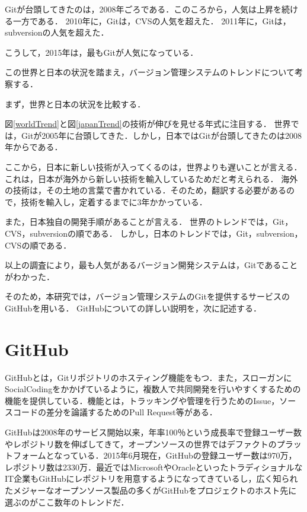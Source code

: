 Gitが台頭してきたのは，2008年ごろである．このころから，人気は上昇を続ける一方である．
2010年に，Gitは，CVSの人気を超えた．
2011年に，Gitは，subversionの人気を超えた．

こうして，2015年は，最もGitが人気になっている．

この世界と日本の状況を踏まえ，バージョン管理システムのトレンドについて考察する．

まず，世界と日本の状況を比較する．

図\ref{worldTrend}と図\ref{japanTrend}の技術が伸びを見せる年式に注目する．
世界では，Gitが2005年に台頭してきた．しかし，日本ではGitが台頭してきたのは2008年からである．

ここから，日本に新しい技術が入ってくるのは，世界よりも遅いことが言える．
これは，日本が海外から新しい技術を輸入しているためだと考えられる．
海外の技術は，その土地の言葉で書かれている．そのため，翻訳する必要があるので，技術を輸入し，定着するまでに3年かかっている．


また，日本独自の開発手順があることが言える．
世界のトレンドでは，Git，CVS，subversionの順である．
しかし，日本のトレンドでは，Git，subversion，CVSの順である．

以上の調査により，最も人気があるバージョン開発システムは，Gitであることがわかった．

そのため，本研究では，バージョン管理システムのGitを提供するサービスのGitHubを用いる．
GitHubについての詳しい説明を，次に記述する．

\section{GitHub}

GitHubとは，Gitリポジトリのホスティング機能をもつ．また，スローガンにSocialCodingをかかげているように，複数人で共同開発を行いやすくするための機能を提供している．機能とは，トラッキングや管理を行うためのIssue，ソースコードの差分を論議するためのPull Request等がある．

GitHubは2008年のサービス開始以来，年率100％という成長率で登録ユーザー数やレポジトリ数を伸ばしてきて，オープンソースの世界ではデファクトのプラットフォームとなっている．2015年6月現在，GitHubの登録ユーザー数は970万，レポジトリ数は2330万．最近ではMicrosoftやOracleといったトラディショナルなIT企業もGitHubにレポジトリを用意するようになってきているし，広く知られたメジャーなオープンソース製品の多くがGitHubをプロジェクトのホスト先に選ぶのがここ数年のトレンドだ\cite{Nishimura2015}．

